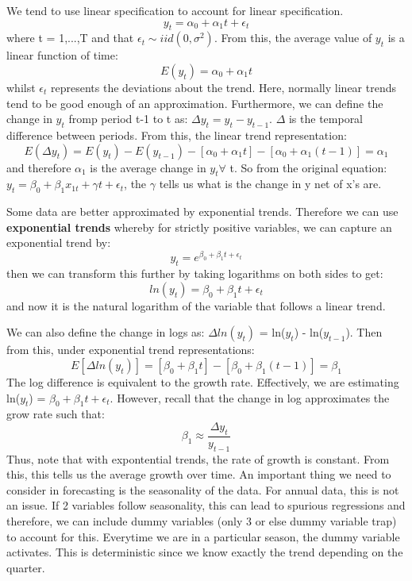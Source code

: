 \documentclass[11pt, oneside]{article}
\theoremstyle{definition}
\begin{document}
We tend to use linear specification to account for linear specification.
$$
y_t = \alpha_0 + \alpha_1t + \epsilon_t
$$
where t = 1,...,T and that $\epsilon_t \sim iid(0,\sigma^2)$. From this, the average value of $y_t$ is a linear function of time:
$$
E(y_t) = \alpha_0 + \alpha_1t
$$
whilst $\epsilon_t$ represents the deviations about the trend. Here, normally linear trends tend to be good enough of an approximation. Furthermore, we can define the change in $y_t$ fromp period t-1 to t as: $\Delta y_t = y_t - y_{t-1}$. $\Delta$ is the temporal difference between periods. From this, the linear trend representation:
$$
E(\Delta y_t) = E(y_t) - E(y_{t-1}) - [\alpha_0 + \alpha_1t] - [\alpha_0 + \alpha_1(t-1)] = \alpha_1
$$
and therefore $\alpha_1$ is the average change in $y_t  \forall $ t. So from the original equation: $y_t = \beta_0 + \beta_1 x_{1t} + \gamma t + \epsilon_{t} $, the $\gamma$ tells us what is the change in y net of x's are.

Some data are better approximated by exponential trends. Therefore we can use \textbf{exponential trends} whereby for strictly positive variables, we can capture an exponential trend by:
$$
y_t = e^{\beta_0 + \beta_1t + \epsilon_t}
$$
then we can transform this further by taking logarithms on both sides to get:
$$
ln(y_t) = \beta_0 + \beta_1t + \epsilon_t
$$
and now it is the natural logarithm of the variable that follows a linear trend.

We can also define the change in logs as: $\Delta ln(y_t)$ = ln($y_t$) - ln($y_{t-1}$). Then from this, under exponential trend representations:
$$
E[\Delta ln(y_t)] = [\beta_0 + \beta_1t] - [\beta_0 + \beta_1(t-1)] = \beta_1
$$
The log difference is equivalent to the growth rate. Effectively, we are estimating ln($y_t$) = $\beta_0 + \beta_1t + \epsilon_t$. However, recall that the change in log approximates the grow rate such that:
$$
\beta_1 \approx \frac{\Delta y_t}{y_{t-1}}
$$
Thus, note that with expontential trends, the rate of growth is constant. From this, this tells us the average growth over time. An important thing we need to consider in forecasting is the seasonality of the data. For annual data, this is not an issue. If 2 variables follow seasonality, this can lead to spurious regressions and therefore, we can include dummy variables (only 3 or else dummy variable trap) to account for this. Everytime we are in a particular season, the dummy variable activates. This is deterministic since we know exactly the trend depending on the quarter.
\end{document}

